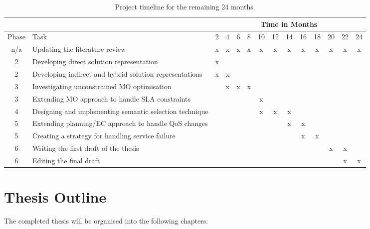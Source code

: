 \begin{table}
\small
\centering
\caption{Project timeline for the remaining 24 months.}
\vspace{0.2cm}
\begin{tabular}{|c|p{50mm}||ccc|ccc|ccc|ccc|}
\hline
& & \multicolumn{12}{c|}{Time in Months} \\ \hline
Phase & Task  & 2 & 4 & 6  & 8 & 10 & 12  & 14 & 16 & 18  & 20 & 22 & 24 \\ \hline
n/a & Updating the literature review
& x & x & x & x & x & x & x & x & x & x & x & x \\ 
2 & Developing direct solution representation
& x &   &    &   &   &    &   &   &    &   &   &   \\
2 & Developing indirect and hybrid solution representations
& x & x &    &   &   &    &   &   &    &   &   &   \\
3 & Investigating unconstrained MO optimisation
&   & x &  x & x &   &    &   &   &    &   &   &   \\
3 & Extending MO approach to handle SLA constraints
&   &   &    &   & x &    &   &   &    &   &   &   \\
4 & Designing and implementing semantic selection technique
&   &   &    &   & x & x  & x &   &    &   &   &   \\
5 & Extending planning/EC approach to handle QoS changes
&   &   &    &   &   &    & x & x &    &   &   &   \\
5 & Creating a strategy for handling service failure
&   &   &    &   &   &    &   & x & x  &   &   &   \\
6 & Writing the first draft of the thesis 
&   &   &    &   &   &    &   &   &    & x & x &   \\
6 & Editing the final draft
&   &   &    &   &   &    &   &   &    &   & x & x \\
\hline
\end{tabular}
\label{tab:projectTimeline}
\end{table}

\section{Thesis Outline}

The completed thesis will be organised into the following chapters:

